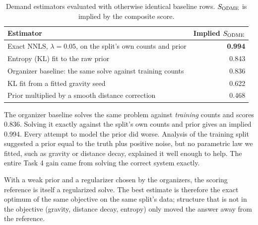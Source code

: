 \begin{table}[h]
\centering\small
\caption{Demand estimators evaluated with otherwise identical baseline rows. $S_{\mathrm{ODME}}$ is implied by the composite score.}\label{tab:odme}
\begin{tabular}{@{}l r@{}}
\toprule
Estimator & Implied $S_{\mathrm{ODME}}$ \\
\midrule
Exact NNLS, $\lambda=0.05$, on the split's own counts and prior & \textbf{0.994} \\
Entropy (KL) fit to the raw prior & 0.843 \\
Organizer baseline: the same solve against training counts & 0.836 \\
KL fit from a fitted gravity seed & 0.622 \\
Prior multiplied by a smooth distance correction & 0.468 \\
\bottomrule
\end{tabular}
\end{table}

The organizer baseline solves the same problem against \emph{training} counts and scores 0.836. Solving it exactly
against the split's own counts and prior gives an implied 0.994. Every attempt to model the prior did worse. Analysis
of the training split suggested a prior equal to the truth plus positive noise, but no parametric law we fitted, such
as gravity or distance decay, explained it well enough to help. The entire Task 4 gain came from solving the correct
system exactly.

With a weak prior and a regularizer chosen by the organizers, the scoring reference is itself a regularized solve. The
best estimate is therefore the exact optimum of the same objective on the same split's data; structure that is not in
the objective (gravity, distance decay, entropy) only moved the answer away from the reference.
